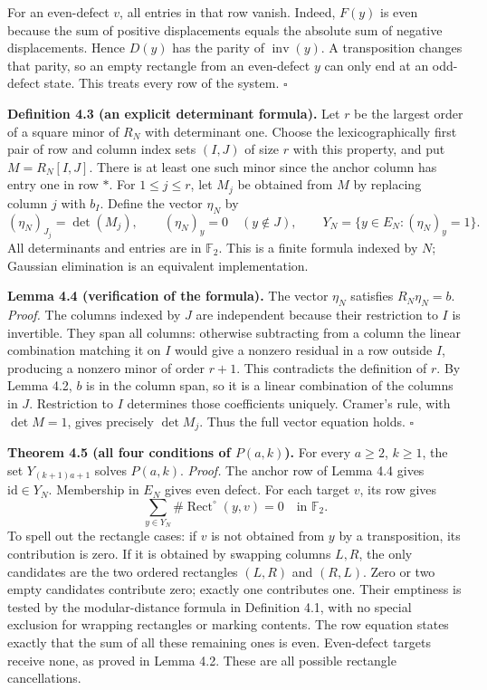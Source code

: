 \documentclass[11pt,a4paper]{article}
\begin{document}
For an even-defect $v$, all entries in that row vanish. Indeed,
$F(y)$ is even because the sum of positive displacements equals the
absolute sum of negative displacements. Hence $D(y)$ has the parity
of $\operatorname{inv}(y)$. A transposition changes that parity,
so an empty rectangle from an even-defect $y$ can only end at an
odd-defect state. This treats every row of the system. $\square$

\textbf{Definition 4.3 (an explicit determinant formula).}
Let $r$ be the largest order of a square minor of $R_N$ with determinant
one. Choose the lexicographically first pair of row and column index
sets $(I,J)$ of size $r$ with this property, and put $M=R_N[I,J]$.
There is at least one such minor since the anchor column has entry one
in row $*$. For $1\le j\le r$, let $M_j$ be obtained from $M$ by
replacing column $j$ with $b_I$. Define the vector $\eta_N$ by
\[
(\eta_N)_{J_j}=\det(M_j),\qquad
(\eta_N)_y=0\quad(y\notin J),
\qquad
Y_N=\{y\in E_N:(\eta_N)_y=1\}.
\]
All determinants and entries are in $\mathbb F_2$. This is a finite
formula indexed by $N$; Gaussian elimination is an equivalent
implementation.

\textbf{Lemma 4.4 (verification of the formula).}
The vector $\eta_N$ satisfies $R_N\eta_N=b$.
\textit{Proof.}
The columns indexed by $J$ are independent because their restriction
to $I$ is invertible. They span all columns: otherwise subtracting
from a column the linear combination matching it on $I$ would give
a nonzero residual in a row outside $I$, producing a nonzero minor
of order $r+1$. This contradicts the definition of $r$.
By Lemma 4.2, $b$ is in the column span, so it is a linear combination
of the columns in $J$. Restriction to $I$ determines those coefficients
uniquely. Cramer's rule, with $\det M=1$, gives precisely
$\det M_j$. Thus the full vector equation holds. $\square$

\textbf{Theorem 4.5 (all four conditions of $P(a,k)$).}
For every $a\ge2$, $k\ge1$, the set $Y_{(k+1)a+1}$ solves $P(a,k)$.
\textit{Proof.}
The anchor row of Lemma 4.4 gives $\mathrm{id}\in Y_N$. Membership
in $E_N$ gives even defect. For each target $v$, its row gives
\[
\sum_{y\in Y_N}\#\operatorname{Rect}^{\circ}(y,v)=0
\quad\text{in }\mathbb F_2.
\]
To spell out the rectangle cases: if $v$ is not obtained from $y$
by a transposition, its contribution is zero. If it is obtained by
swapping columns $L,R$, the only candidates are the two ordered
rectangles $(L,R)$ and $(R,L)$. Zero or two empty candidates
contribute zero; exactly one contributes one. Their emptiness is
tested by the modular-distance formula in Definition 4.1, with no
special exclusion for wrapping rectangles or marking contents.
The row equation states exactly that the sum of all these remaining
ones is even. Even-defect targets receive none, as proved in
Lemma 4.2. These are all possible rectangle cancellations.
\end{document}
